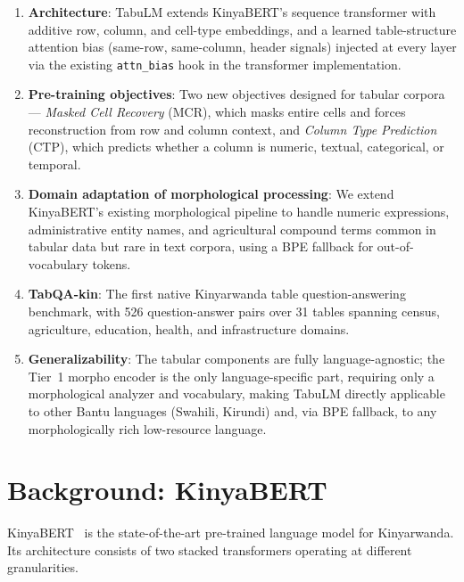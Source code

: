 \documentclass[11pt]{article}
\begin{document}
\begin{enumerate}
    \item \textbf{Architecture}: TabuLM extends KinyaBERT's sequence transformer with additive row, column, and cell-type embeddings, and a learned table-structure attention bias (same-row, same-column, header signals) injected at every layer via the existing \texttt{attn\_bias} hook in the transformer implementation.

    \item \textbf{Pre-training objectives}: Two new objectives designed for tabular corpora --- \textit{Masked Cell Recovery} (MCR), which masks entire cells and forces reconstruction from row and column context, and \textit{Column Type Prediction} (CTP), which predicts whether a column is numeric, textual, categorical, or temporal.

    \item \textbf{Domain adaptation of morphological processing}: We extend KinyaBERT's existing morphological pipeline to handle numeric expressions, administrative entity names, and agricultural compound terms common in tabular data but rare in text corpora, using a BPE fallback for out-of-vocabulary tokens.

    \item \textbf{TabQA-kin}: The first native Kinyarwanda table question-answering benchmark, with 526 question-answer pairs over 31 tables spanning census, agriculture, education, health, and infrastructure domains.

    \item \textbf{Generalizability}: The tabular components are fully language-agnostic; the Tier~1 morpho encoder is the only language-specific part, requiring only a morphological analyzer and vocabulary, making TabuLM directly applicable to other Bantu languages (Swahili, Kirundi) and, via BPE fallback, to any morphologically rich low-resource language.
\end{enumerate}

\section{Background: KinyaBERT}
\label{sec:background}

KinyaBERT~\citep{nzeyimana-niyongabo-rubungo-2022-kinyabert} is the state-of-the-art pre-trained language model for Kinyarwanda.
Its architecture consists of two stacked transformers operating at different granularities.
\end{document}
